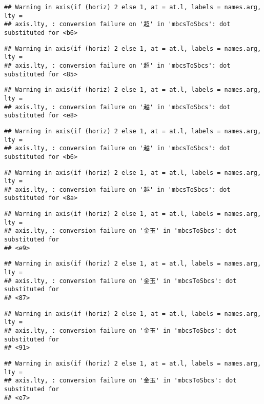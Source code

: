 \documentclass[
]{article}
\begin{document}
\begin{verbatim}
## Warning in axis(if (horiz) 2 else 1, at = at.l, labels = names.arg, lty =
## axis.lty, : conversion failure on '超' in 'mbcsToSbcs': dot substituted for <b6>
\end{verbatim}

\begin{verbatim}
## Warning in axis(if (horiz) 2 else 1, at = at.l, labels = names.arg, lty =
## axis.lty, : conversion failure on '超' in 'mbcsToSbcs': dot substituted for <85>
\end{verbatim}

\begin{verbatim}
## Warning in axis(if (horiz) 2 else 1, at = at.l, labels = names.arg, lty =
## axis.lty, : conversion failure on '越' in 'mbcsToSbcs': dot substituted for <e8>
\end{verbatim}

\begin{verbatim}
## Warning in axis(if (horiz) 2 else 1, at = at.l, labels = names.arg, lty =
## axis.lty, : conversion failure on '越' in 'mbcsToSbcs': dot substituted for <b6>
\end{verbatim}

\begin{verbatim}
## Warning in axis(if (horiz) 2 else 1, at = at.l, labels = names.arg, lty =
## axis.lty, : conversion failure on '越' in 'mbcsToSbcs': dot substituted for <8a>
\end{verbatim}

\begin{verbatim}
## Warning in axis(if (horiz) 2 else 1, at = at.l, labels = names.arg, lty =
## axis.lty, : conversion failure on '金玉' in 'mbcsToSbcs': dot substituted for
## <e9>
\end{verbatim}

\begin{verbatim}
## Warning in axis(if (horiz) 2 else 1, at = at.l, labels = names.arg, lty =
## axis.lty, : conversion failure on '金玉' in 'mbcsToSbcs': dot substituted for
## <87>
\end{verbatim}

\begin{verbatim}
## Warning in axis(if (horiz) 2 else 1, at = at.l, labels = names.arg, lty =
## axis.lty, : conversion failure on '金玉' in 'mbcsToSbcs': dot substituted for
## <91>
\end{verbatim}

\begin{verbatim}
## Warning in axis(if (horiz) 2 else 1, at = at.l, labels = names.arg, lty =
## axis.lty, : conversion failure on '金玉' in 'mbcsToSbcs': dot substituted for
## <e7>
\end{verbatim}
\end{document}
